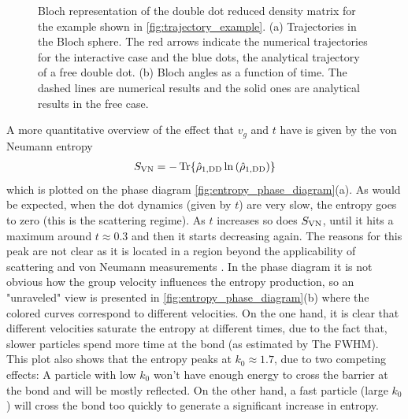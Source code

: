 \documentclass{article}
\newcommand\sj[1]{ {\color{orange} #1} }
\begin{document}
\begin{figure}[h]
\begin{subfigure}[b]{0.5\textwidth}
        \caption{}
    \end{subfigure}
    \caption{Bloch representation of the double dot reduced density matrix for the example shown 
    in \ref{fig:trajectory_example}. (a) Trajectories in the Bloch sphere. The red arrows indicate
    the numerical trajectories for the interactive case and the blue dots, the analytical trajectory
    of a free double dot. (b) Bloch angles as a function of time. The dashed lines are numerical
    results and the solid ones are analytical results in the free case. }
    \label{fig:bloch_representation}
\end{figure}

A more quantitative overview of the effect that $v_g$ and $t$ have is given by the von Neumann 
entropy 
\begin{align}
    S_{\rm VN} = - \Tr{\hat{\rho}_{1,\rm DD} \ln{(\hat{\rho}_{1,\rm DD})} }  
\end{align}
which is plotted on the phase diagram \ref{fig:entropy_phase_diagram}(a). As would be expected,
when the dot dynamics (given by $t$) are very slow, the entropy goes to zero (this is the scattering
regime). As $t$ increases so does $S_{\rm VN}$, until it hits a maximum around $t\approx 0.3$ and then it 
starts decreasing again. \sj{The reasons for this peak are not clear as it is located in a 
region beyond the applicability of scattering and von Neumann measurements}. In the phase diagram
it is not obvious how the group velocity influences the entropy production, so an "unraveled" view 
is presented in \ref{fig:entropy_phase_diagram}(b) where the colored curves correspond to different
velocities. On the one hand, it is clear that different velocities saturate the entropy at different
times, due to the fact that, slower particles spend more time at the bond (as estimated by The
FWHM). This plot also shows that the entropy peaks at $k_0\approx 1.7$, due to two competing effects:
A particle with low $k_0$ won't have enough energy to cross the barrier at the bond
and will be mostly reflected. On the other hand, a fast particle (large $k_0$) will cross the bond 
too quickly to generate a significant increase in entropy. 
\end{document}
